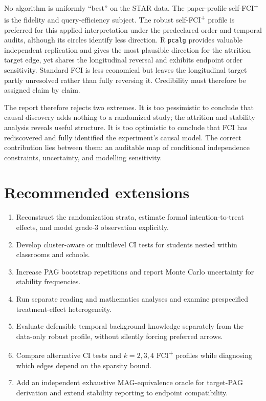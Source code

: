 \documentclass[11pt,a4paper,oneside]{report}
\newcommand{\FCIplus}{FCI\textsuperscript{+}}
\newcommand{\code}[1]{\texttt{#1}}
\begin{document}
No algorithm is uniformly ``best'' on the STAR data. The paper-profile
self-\FCIplus{} is the fidelity and query-efficiency subject. The robust
self-\FCIplus{} profile is preferred for this applied interpretation under
the predeclared order and temporal audits, although its circles identify less
direction. R \code{pcalg} provides
valuable independent replication and gives the most plausible direction for
the attrition target edge, yet shares the longitudinal reversal and exhibits
endpoint order sensitivity. Standard FCI is less economical but leaves the
longitudinal target partly unresolved rather than fully reversing it.
Credibility must therefore be assigned claim by claim.

The report therefore rejects two extremes. It is too pessimistic to conclude
that causal discovery adds nothing to a randomized study; the attrition and
stability analysis reveals useful structure. It is too optimistic to conclude
that FCI has rediscovered and fully identified the experiment's causal model.
The correct contribution lies between them: an auditable map of conditional
independence constraints, uncertainty, and modelling sensitivity.

\section{Recommended extensions}

\begin{enumerate}[leftmargin=2em,itemsep=0.25em,parsep=0pt,topsep=0.3em]
  \item Reconstruct the randomization strata, estimate formal intention-to-treat
        effects, and model grade-3 observation explicitly.
  \item Develop cluster-aware or multilevel CI tests for students nested within
        classrooms and schools.
  \item Increase PAG bootstrap repetitions and report Monte Carlo uncertainty
        for stability frequencies.
  \item Run separate reading and mathematics analyses and examine prespecified
        treatment-effect heterogeneity.
  \item Evaluate defensible temporal background knowledge separately from the
        data-only robust profile, without silently forcing preferred arrows.
  \item Compare alternative CI tests and \(k=2,3,4\) \FCIplus{} profiles while
        diagnosing which edges depend on the sparsity bound.
  \item Add an independent exhaustive MAG-equivalence oracle for target-PAG
        derivation and extend stability reporting to endpoint compatibility.
\end{enumerate}
\end{document}
